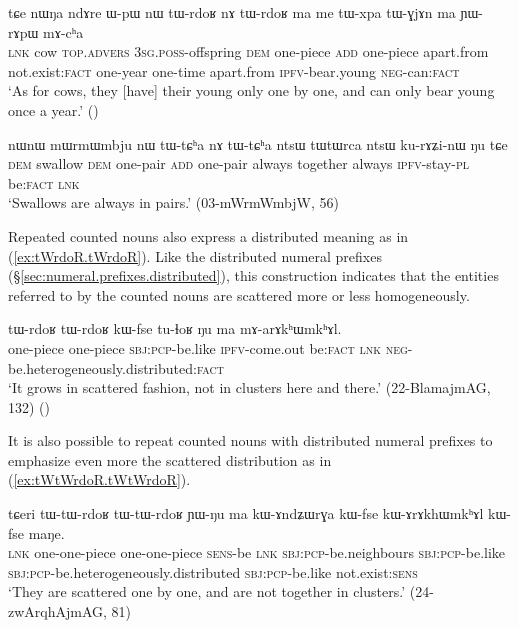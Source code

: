 \begin{exe}
	\ex \label{ex:tWrdoʁ.nA.tWrdoʁ}
	\gll  tɕe nɯŋa ndɤre ɯ-pɯ nɯ tɯ-rdoʁ nɤ tɯ-rdoʁ ma me tɯ-xpa tɯ-ɣjɤn ma ɲɯ-rɤpɯ mɤ-cʰa \\
	\textsc{lnk} cow \textsc{top}.\textsc{advers} \textsc{3sg}.\textsc{poss}-offspring \textsc{dem} one-piece \textsc{add} one-piece apart.from not.exist:\textsc{fact}  one-year one-time apart.from \textsc{ipfv}-bear.young \textsc{neg}-can:\textsc{fact} \\
	\glt `As for cows, they [have] their young only one by one, and can only bear young once a year.'
()
\end{exe}

\begin{exe}
	\ex \label{ex:tWCha.nA.tWCha}
	\gll nɯnɯ mɯrmɯmbju nɯ tɯ-tɕʰa nɤ tɯ-tɕʰa ntsɯ tɯtɯrca ntsɯ ku-rɤʑi-nɯ ŋu tɕe \\
	\textsc{dem} swallow \textsc{dem} one-pair \textsc{add}  one-pair  always together always \textsc{ipfv}-stay-\textsc{pl} be:\textsc{fact} \textsc{lnk}  \\
	\glt `Swallows are always in pairs.' (03-mWrmWmbjW, 56)
\end{exe}

Repeated counted nouns also express a distributed meaning as in (\ref{ex:tWrdoR.tWrdoR}). Like the distributed numeral prefixes (§\ref{sec:numeral.prefixes.distributed}), this construction indicates that the entities referred to by the counted nouns are scattered more or less homogeneously.

\begin{exe}
	\ex \label{ex:tWrdoR.tWrdoR}
	\gll  tɯ-rdoʁ tɯ-rdoʁ kɯ-fse tu-ɬoʁ ŋu ma mɤ-arɤkʰɯmkʰɤl. \\
	one-piece one-piece \textsc{sbj}:\textsc{pcp}-be.like \textsc{ipfv}-come.out  be:\textsc{fact} \textsc{lnk} \textsc{neg}-be.heterogeneously.distributed:\textsc{fact} \\
	\glt `It grows in scattered fashion, not in clusters here and there.' (22-BlamajmAG, 132)
()
\end{exe}

It is also possible to repeat counted nouns with distributed numeral prefixes to emphasize even more the scattered distribution as in (\ref{ex:tWtWrdoR.tWtWrdoR}).

\begin{exe}
	\ex \label{ex:tWtWrdoR.tWtWrdoR}
	\gll 
	tɕeri tɯ-tɯ-rdoʁ tɯ-tɯ-rdoʁ ɲɯ-ŋu ma kɯ-ɤndʑɯrɣa kɯ-fse kɯ-ɤrɤkhɯmkʰɤl kɯ-fse maŋe.  \\
	\textsc{lnk} one-one-piece one-one-piece \textsc{sens}-be \textsc{lnk}  \textsc{sbj}:\textsc{pcp}-be.neighbours \textsc{sbj}:\textsc{pcp}-be.like \textsc{sbj}:\textsc{pcp}-be.heterogeneously.distributed \textsc{sbj}:\textsc{pcp}-be.like not.exist:\textsc{sens} \\
	\glt  `They are scattered one by one, and are not together in clusters.' (24-zwArqhAjmAG, 81)
\end{exe}


